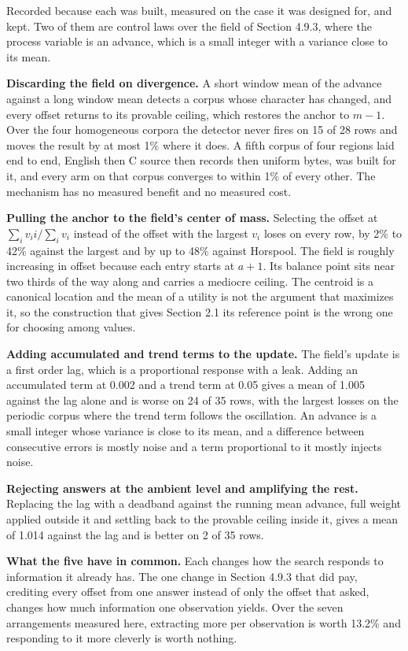 Recorded because each was built, measured on the case it was designed for, and kept. Two of them are control laws over the field of Section 4.9.3, where the process variable is an advance, which is a small integer with a variance close to its mean.

\noindent\textbf{Discarding the field on divergence.} A short window mean of the advance against a long window mean detects a corpus whose character has changed, and every offset returns to its provable ceiling, which restores the anchor to \(m-1\). Over the four homogeneous corpora the detector never fires on 15 of 28 rows and moves the result by at most 1\% where it does. A fifth corpus of four regions laid end to end, English then C source then records then uniform bytes, was built for it, and every arm on that corpus converges to within 1\% of every other. The mechanism has no measured benefit and no measured cost.

\noindent\textbf{Pulling the anchor to the field's center of mass.} Selecting the offset at \(\sum_i v_i i / \sum_i v_i\) instead of the offset with the largest \(v_i\) loses on every row, by 2\% to 42\% against the largest and by up to 48\% against Horspool. The field is roughly increasing in offset because each entry starts at \(a+1\). Its balance point sits near two thirds of the way along and carries a mediocre ceiling. The centroid is a canonical location and the mean of a utility is not the argument that maximizes it, so the construction that gives Section 2.1 its reference point is the wrong one for choosing among values.

\noindent\textbf{Adding accumulated and trend terms to the update.} The field's update is a first order lag, which is a proportional response with a leak. Adding an accumulated term at 0.002 and a trend term at 0.05 gives a mean of 1.005 against the lag alone and is worse on 24 of 35 rows, with the largest losses on the periodic corpus where the trend term follows the oscillation. An advance is a small integer whose variance is close to its mean, and a difference between consecutive errors is mostly noise and a term proportional to it mostly injects noise.

\noindent\textbf{Rejecting answers at the ambient level and amplifying the rest.} Replacing the lag with a deadband against the running mean advance, full weight applied outside it and settling back to the provable ceiling inside it, gives a mean of 1.014 against the lag and is better on 2 of 35 rows.

\noindent\textbf{What the five have in common.} Each changes how the search responds to information it already has. The one change in Section 4.9.3 that did pay, crediting every offset from one answer instead of only the offset that asked, changes how much information one observation yields. Over the seven arrangements measured here, extracting more per observation is worth 13.2\% and responding to it more cleverly is worth nothing.

